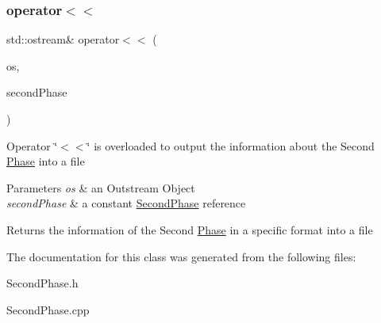 \subsubsection{\texorpdfstring{operator$<$$<$}{operator<<}}
{\footnotesize\ttfamily std\+::ostream\& operator$<$$<$ (\begin{DoxyParamCaption}\item[{std\+::ostream \&}]{os,  }\item[{const \hyperlink{class_second_phase}{Second\+Phase} \&}]{second\+Phase }\end{DoxyParamCaption})\hspace{0.3cm}{\ttfamily [friend]}}

Operator \char`\"{}$<$$<$\char`\"{} is overloaded to output the information about the Second \hyperlink{class_phase}{Phase} into a file 
\begin{DoxyParams}{Parameters}
{\em os} & an Outstream Object \\
\hline
{\em second\+Phase} & a constant \hyperlink{class_second_phase}{Second\+Phase} reference \\
\hline
\end{DoxyParams}
\begin{DoxyReturn}{Returns}
the information of the Second \hyperlink{class_phase}{Phase} in a specific format into a file 
\end{DoxyReturn}


The documentation for this class was generated from the following files\+:\begin{DoxyCompactItemize}
\item 
Second\+Phase.\+h\item 
Second\+Phase.\+cpp\end{DoxyCompactItemize}

